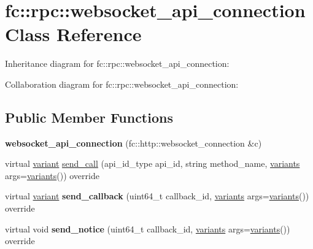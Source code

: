 \hypertarget{classfc_1_1rpc_1_1websocket__api__connection}{}\section{fc\+:\+:rpc\+:\+:websocket\+\_\+api\+\_\+connection Class Reference}
\label{classfc_1_1rpc_1_1websocket__api__connection}


Inheritance diagram for fc\+:\+:rpc\+:\+:websocket\+\_\+api\+\_\+connection\+:


Collaboration diagram for fc\+:\+:rpc\+:\+:websocket\+\_\+api\+\_\+connection\+:
\subsection*{Public Member Functions}
\begin{DoxyCompactItemize}
\item 
\mbox{\label{classfc_1_1rpc_1_1websocket__api__connection_abe1996df25102b53d14348ef2336f6be}} 
{\bfseries websocket\+\_\+api\+\_\+connection} (fc\+::http\+::websocket\+\_\+connection \&c)
\item 
virtual \mbox{\hyperlink{classfc_1_1variant}{variant}} \mbox{\hyperlink{classfc_1_1rpc_1_1websocket__api__connection_a30eb8e7cdee7c2ca0049f565f100ab14}{send\+\_\+call}} (api\+\_\+id\+\_\+type api\+\_\+id, string method\+\_\+name, \mbox{\hyperlink{classstd_1_1vector}{variants}} args=\mbox{\hyperlink{classstd_1_1vector}{variants}}()) override
\item 
\mbox{\label{classfc_1_1rpc_1_1websocket__api__connection_a7c420430971d7e9af1b3e11b043de1c8}} 
virtual \mbox{\hyperlink{classfc_1_1variant}{variant}} {\bfseries send\+\_\+callback} (uint64\+\_\+t callback\+\_\+id, \mbox{\hyperlink{classstd_1_1vector}{variants}} args=\mbox{\hyperlink{classstd_1_1vector}{variants}}()) override
\item 
\mbox{\label{classfc_1_1rpc_1_1websocket__api__connection_adc639d508ff7b2442badd783c19b469b}} 
virtual void {\bfseries send\+\_\+notice} (uint64\+\_\+t callback\+\_\+id, \mbox{\hyperlink{classstd_1_1vector}{variants}} args=\mbox{\hyperlink{classstd_1_1vector}{variants}}()) override
\end{DoxyCompactItemize}
